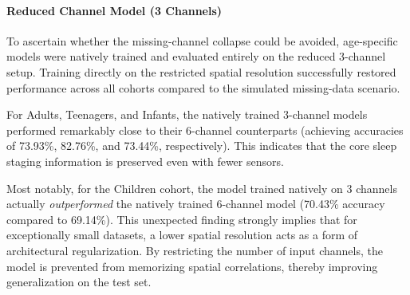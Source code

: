 \paragraph{Reduced Channel Model (3 Channels)}
To ascertain whether the missing-channel collapse could be avoided, age-specific models were natively trained and evaluated entirely on the reduced 3-channel setup. Training directly on the restricted spatial resolution successfully restored performance across all cohorts compared to the simulated missing-data scenario.

For Adults, Teenagers, and Infants, the natively trained 3-channel models performed remarkably close to their 6-channel counterparts (achieving accuracies of 73.93\%, 82.76\%, and 73.44\%, respectively). This indicates that the core sleep staging information is preserved even with fewer sensors. 

Most notably, for the Children cohort, the model trained natively on 3 channels actually \textit{outperformed} the natively trained 6-channel model (70.43\% accuracy compared to 69.14\%). This unexpected finding strongly implies that for exceptionally small datasets, a lower spatial resolution acts as a form of architectural regularization. By restricting the number of input channels, the model is prevented from memorizing spatial correlations, thereby improving generalization on the test set.

\begin{table}[ht]
\centering
\caption{Test set performance for the Age-Specific Models. Results are shown for the models evaluated on the full 6 channels, evaluated on 3 channels (robustness test), and trained natively on 3 channels.}
\label{tab:age_specific_results}
\end{table}

